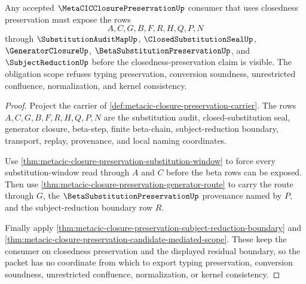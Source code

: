 \begin{theorem}
\label{thm:metacic-closure-preservation-obligation-scope}
Any accepted $\MetaCICClosurePreservationUp$ consumer that uses closedness preservation must expose the rows
$$
A,C,G,B,F,R,H,Q,P,N
$$
through $\SubstitutionAuditMapUp$, $\ClosedSubstitutionSealUp$, $\GeneratorClosureUp$, $\BetaSubstitutionPreservationUp$, and $\SubjectReductionUp$ before the closedness-preservation claim is visible. The obligation scope refuses typing preservation, conversion soundness, unrestricted confluence, normalization, and kernel consistency.
\end{theorem}
\begin{proof}
Project the carrier of \autoref{def:metacic-closure-preservation-carrier}. The rows $A,C,G,B,F,R,H,Q,P,N$ are the substitution audit, closed-substitution seal, generator closure, beta-step, finite beta-chain, subject-reduction boundary, transport, replay, provenance, and local naming coordinates.

Use \autoref{thm:metacic-closure-preservation-substitution-window} to force every substitution-window read through $A$ and $C$ before the beta rows can be exposed. Then use \autoref{thm:metacic-closure-preservation-generator-route} to carry the route through $G$, the $\BetaSubstitutionPreservationUp$ provenance named by $P$, and the subject-reduction boundary row $R$.

Finally apply \autoref{thm:metacic-closure-preservation-subject-reduction-boundary} and \autoref{thm:metacic-closure-preservation-candidate-mediated-scope}. These keep the consumer on closedness preservation and the displayed residual boundary, so the packet has no coordinate from which to export typing preservation, conversion soundness, unrestricted confluence, normalization, or kernel consistency.
\end{proof}

